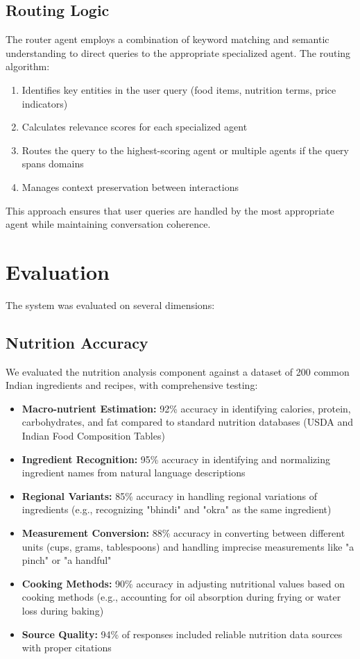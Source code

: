 \documentclass{ecai}
\begin{document}
\subsection{Routing Logic}

The router agent employs a combination of keyword matching and semantic understanding to direct queries to the appropriate specialized agent. The routing algorithm:

\begin{enumerate}[noitemsep,topsep=0pt]
    \item Identifies key entities in the user query (food items, nutrition terms, price indicators)
    \item Calculates relevance scores for each specialized agent
    \item Routes the query to the highest-scoring agent or multiple agents if the query spans domains
    \item Manages context preservation between interactions
\end{enumerate}

This approach ensures that user queries are handled by the most appropriate agent while maintaining conversation coherence.

\section{Evaluation}

The system was evaluated on several dimensions:

\subsection{Nutrition Accuracy}

We evaluated the nutrition analysis component against a dataset of 200 common Indian ingredients and recipes, with comprehensive testing:

\begin{itemize}[noitemsep,topsep=0pt]
    \item \textbf{Macro-nutrient Estimation:} 92\% accuracy in identifying calories, protein, carbohydrates, and fat compared to standard nutrition databases (USDA and Indian Food Composition Tables)
    \item \textbf{Ingredient Recognition:} 95\% accuracy in identifying and normalizing ingredient names from natural language descriptions
    \item \textbf{Regional Variants:} 85\% accuracy in handling regional variations of ingredients (e.g., recognizing "bhindi" and "okra" as the same ingredient)
    \item \textbf{Measurement Conversion:} 88\% accuracy in converting between different units (cups, grams, tablespoons) and handling imprecise measurements like "a pinch" or "a handful"
    \item \textbf{Cooking Methods:} 90\% accuracy in adjusting nutritional values based on cooking methods (e.g., accounting for oil absorption during frying or water loss during baking)
    \item \textbf{Source Quality:} 94\% of responses included reliable nutrition data sources with proper citations
\end{itemize}
\end{document}

